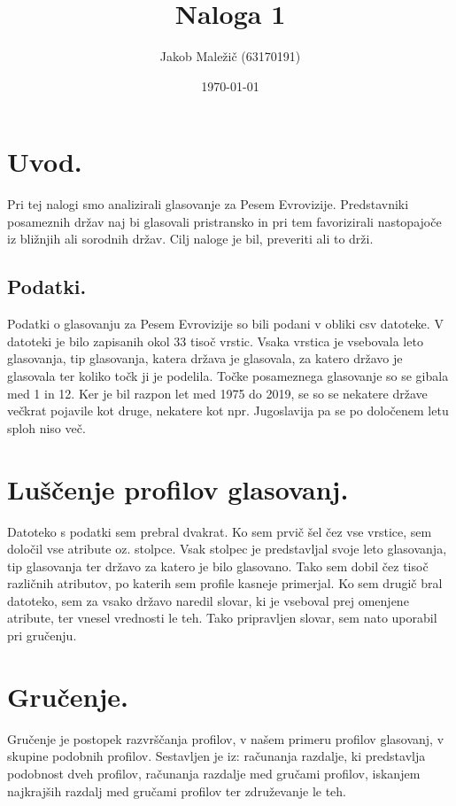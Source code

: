 \documentclass[a4paper,11pt]{article}
\title{Naloga 1}
\author{Jakob Maležič (63170191)}
\date{\today}
\begin{document}
\maketitle

\section{Uvod.}
Pri tej nalogi smo analizirali glasovanje za Pesem Evrovizije. Predstavniki posameznih držav naj bi glasovali pristransko in pri tem favorizirali nastopajoče iz bližnjih ali sorodnih držav. Cilj naloge je bil, preveriti ali to drži.

\subsection{Podatki.}
Podatki o glasovanju za Pesem Evrovizije so bili podani v obliki csv datoteke. V datoteki je bilo zapisanih okol 33 tisoč vrstic. Vsaka vrstica je vsebovala leto glasovanja, tip glasovanja, katera država je glasovala, za katero državo je glasovala ter koliko točk ji je podelila. Točke posameznega glasovanje so se gibala med 1 in 12. Ker je bil razpon let med 1975 do 2019, se so se nekatere države večkrat pojavile kot druge, nekatere kot npr. Jugoslavija pa se po določenem letu sploh niso več.

\section{Luščenje profilov glasovanj.}
Datoteko s podatki sem prebral dvakrat. Ko sem prvič šel čez vse vrstice, sem določil vse atribute oz. stolpce. Vsak stolpec je predstavljal svoje leto glasovanja, tip glasovanja ter državo za katero je bilo glasovano. Tako sem dobil čez tisoč različnih atributov, po katerih sem profile kasneje primerjal. Ko sem drugič bral datoteko, sem za vsako državo naredil slovar, ki je vseboval prej omenjene atribute, ter vnesel vrednosti le teh. Tako pripravljen slovar, sem nato uporabil pri gručenju.

\section{Gručenje.}
Gručenje je postopek razvrščanja profilov, v našem primeru profilov glasovanj, v skupine podobnih profilov. Sestavljen je iz: računanja razdalje, ki predstavlja podobnost dveh profilov, računanja razdalje med gručami profilov, iskanjem najkrajših razdalj med gručami profilov ter združevanje le teh.
\end{document}
